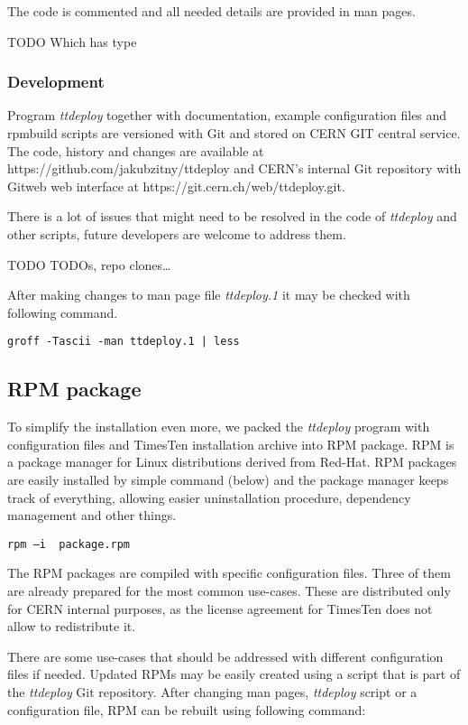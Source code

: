 \documentclass[11pt, letterpaper]{article}
\begin{document}
The code is commented and all needed details are provided in man pages.

TODO Which has type

\subsubsection{Development}

Program \emph{ttdeploy} together with documentation, example configuration files and rpmbuild scripts are versioned with Git and stored on CERN GIT central service. The code, history and changes are available at https://github.com/jakubzitny/ttdeploy and CERN's internal Git repository with Gitweb web interface at https://git.cern.ch/web/ttdeploy.git.

There is a lot of issues that might need to be resolved in the code of \emph{ttdeploy} and other scripts, future developers are welcome to address them.

TODO TODOs, repo clones…

After making changes to man page file \emph{ttdeploy.1} it may be checked with following command.

\begin{lstlisting}
groff -Tascii -man ttdeploy.1 | less
\end{lstlisting}

\subsection{RPM package}
To simplify the installation even more, we packed the \emph{ttdeploy} program with configuration files and TimesTen installation archive into RPM package. RPM is a package manager for Linux distributions derived from Red-Hat. RPM packages are easily installed by simple command (below) and the package manager keeps track of everything, allowing easier uninstallation procedure, dependency management and other things.

\begin{lstlisting}
rpm –i  package.rpm
\end{lstlisting}

The RPM packages are compiled with specific configuration files. Three of them are already prepared for the most common use-cases. These are distributed only for CERN internal purposes, as the license agreement for TimesTen does not allow to redistribute it.

There are some use-cases that should be addressed with different configuration files if needed. Updated RPMs may be easily created using a script that is part of the \emph{ttdeploy} Git repository. After changing man pages, \emph{ttdeploy} script or a configuration file, RPM can be rebuilt using following command:
\end{document}
